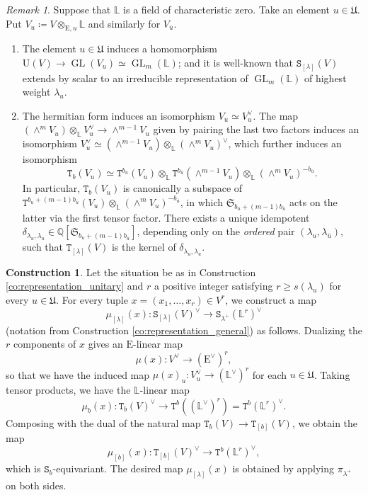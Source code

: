\documentclass[12pt]{amsart}
\numberwithin{equation}{section}
\theoremstyle{plain}
\theoremstyle{definition}
\newtheorem{construction}[proposition]{Construction}
\theoremstyle{remark}
\newtheorem{remark}[proposition]{Remark}
\renewcommand{\d}[1]{\mathbb{#1}}
\newcommand{\f}[1]{\mathfrak{#1}}
\renewcommand{\r}[1]{\mathrm{#1}}
\renewcommand{\(}{\left(}
\renewcommand{\)}{\right)}
\newcommand{\ol}[1]{\overline{#1}{}}
\renewcommand{\geq}{\geqslant}
\newcommand{\dL}{\d L}
\newcommand{\dQ}{\d Q}
\newcommand{\fS}{\f S}
\newcommand{\fU}{\f U}
\newcommand{\rE}{\r E}
\newcommand{\rU}{\r U}
\newcommand{\tS}{\mathtt{S}}
\newcommand{\tT}{\mathtt{T}}
\DeclareMathOperator{\GL}{GL}
\begin{document}
\begin{remark}\label{re:representation_unitary}
Suppose that $\dL$ is a field of characteristic zero. Take an element $u\in\fU$. Put $V_u\coloneqq V\otimes_{\rE,u}\dL$ and similarly for $V_{\ol{u}}$.
\begin{enumerate}
  \item The element $u\in\fU$ induces a homomorphism $\rU(V)\to\GL(V_u)\simeq\GL_m(\dL)$; and it is well-known that $\tS_{[\lambda]}(V)$ extends by scalar to an irreducible representation of $\GL_m(\dL)$ of highest weight $\lambda_u$.

  \item The hermitian form induces an isomorphism $V_{\ol{u}}\simeq V_u^\vee$. The map $(\wedge^m V_u)\otimes_\dL V_u^\vee\to\wedge^{m-1}V_u$ given by pairing the last two factors induces an isomorphism $V_u^\vee\simeq (\wedge^{m-1}V_u)\otimes_\dL(\wedge^mV_u)^{\vee}$, which further induces an isomorphism
      \[
      \tT_b(V_u)\simeq \tT^{b_u}(V_u)\otimes_\dL\tT^{b_{\ol{u}}}(\wedge^{m-1}V_u)\otimes_\dL(\wedge^mV_u)^{-b_{\ol{u}}}.
      \]
      In particular, $\tT_b(V_u)$ is canonically a subspace of $\tT^{b_u+(m-1)b_{\ol{u}}}(V_u)\otimes_\dL(\wedge^mV_u)^{-b_{\ol{u}}}$, in which $\fS_{b_u+(m-1)b_{\ol{u}}}$ acts on the latter via the first tensor factor. There exists a unique idempotent $\delta_{\lambda_u,\lambda_{\ol{u}}}\in\dQ[\fS_{b_u+(m-1)b_{\ol{u}}}]$, depending only on the \emph{ordered} pair $(\lambda_u,\lambda_{\ol{u}})$, such that $\tT_{[\lambda]}(V)$ is the kernel of $\delta_{\lambda_u,\lambda_{\ol{u}}}$.
\end{enumerate}


\end{remark}





\begin{construction}\label{co:special_map}
Let the situation be as in Construction \ref{co:representation_unitary} and $r$ a positive integer satisfying $r\geq s(\lambda_u)$ for every $u\in\fU$. For every tuple $x=(x_1,\dots,x_r)\in V^r$, we construct a map
\[
\mu_{[\lambda]}(x)\colon\tS_{[\lambda]}(V)^\vee\to\tS_{\lambda^+}(\dL^r)^\vee
\]
(notation from Construction \ref{co:representation_general}) as follows. Dualizing the $r$ components of $x$ gives an $\rE$-linear map
\[
\mu(x)\colon V^\vee\to(\rE^\vee)^r,
\]
so that we have the induced map $\mu(x)_u\colon V_u^\vee\to(\dL^\vee)^r$ for each $u\in\fU$. Taking tensor products, we have the $\dL$-linear map
\[
\mu_b(x)\colon\tT_b(V)^\vee\to \tT^b((\dL^\vee)^r)=\tT^b(\dL^r)^\vee.
\]
Composing with the dual of the natural map $\tT_b(V)\to\tT_{[b]}(V)$, we obtain the map
\[
\mu_{[b]}(x)\colon\tT_{[b]}(V)^\vee\to \tT^b(\dL^r)^\vee,
\]
which is $\tS_b$-equivariant. The desired map $\mu_{[\lambda]}(x)$ is obtained by applying $\pi_{\lambda^+}$ on both sides.
\end{construction}
\end{document}
